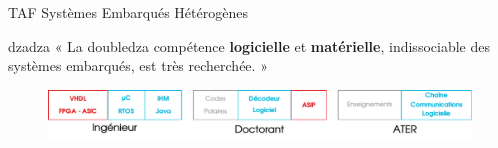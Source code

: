 \documentclass[t,compress,mathserif,12pt,xcolor=dvipsnames]{beamer}
\newcommand{\RED} [1]{\textcolor{Paired-5}{\textbf{#1}}}
\newcommand{\BLUE} [1]{\textcolor{bleuUni}{\textbf{#1}}}
\begin{document}
\begin{frame}[t]{TAF Systèmes Embarqués Hétérogènes}
  \begin{minipage}[t][5.0cm][t]{\textwidth}
  \centering
  \vspace{0.8cm}
dzadza
    « La doubledza compétence \BLUE{logicielle} et \RED{matérielle}, indissociable des systèmes embarqués, est très recherchée. »

  \end{minipage}
  \begin{figure}[htp]
    \centering
    \includegraphics[width=\textwidth]{fig/frise12}
  \end{figure}
\end{frame}
\end{document}
